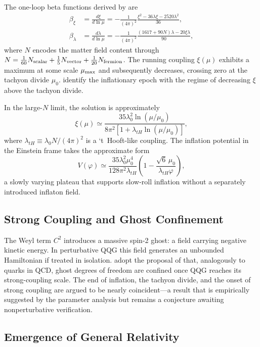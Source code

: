 \documentclass[12pt, a4paper]{article}
\begin{document}
The one-loop beta functions derived by \citet{Buccio2024} are
\begin{align}
\beta_\xi &= \frac{d\xi}{d\ln\mu} = -\frac{1}{(4\pi)^2}\frac{\xi^2 - 36\lambda\xi - 2520\lambda^2}{36}, \\
\beta_\lambda &= \frac{d\lambda}{d\ln\mu} = -\frac{1}{(4\pi)^2}\frac{(1617 + 90N)\lambda - 20\xi\lambda}{90},
\end{align}
where $N$ encodes the matter field content through $N = \frac{1}{60}N_{\rm scalar} +
\frac{1}{5}N_{\rm vector} + \frac{1}{20}N_{\rm fermion}$. The running coupling
$\xi(\mu)$ exhibits a maximum at some scale $\mu_{\rm max}$ and subsequently
decreases, crossing zero at the tachyon divide $\mu_0$. \citet{Liu2026} identify
the inflationary epoch with the regime of decreasing $\xi$ above the tachyon divide.

In the large-$N$ limit, the solution is approximately
\begin{equation}
\xi(\mu) \simeq \frac{35\lambda_0^2\ln(\mu/\mu_0)}{8\pi^2[1 + \lambda_{tH}\ln(\mu/\mu_0)]},
\end{equation}
where $\lambda_{tH} \equiv \lambda_0 N/(4\pi)^2$ is a `t~Hooft-like coupling. The
inflation potential in the Einstein frame takes the approximate form
\begin{equation}
V(\varphi) \simeq \frac{35\lambda_0^2\mu_0^4}{128\pi^2\lambda_{tH}}
\left(1 - \frac{\sqrt{6}\,\mu_0}{\lambda_{tH}\varphi}\right),
\end{equation}
a slowly varying plateau that supports slow-roll inflation without a separately
introduced inflaton field.

\subsection{Strong Coupling and Ghost Confinement}

The Weyl term $C^2$ introduces a massive spin-2 ghost: a field carrying negative
kinetic energy. In perturbative QQG this field generates an unbounded Hamiltonian
if treated in isolation. \citet{Liu2026} adopt the proposal of \citet{Holdom2016}
that, analogously to quarks in QCD, ghost degrees of freedom are confined once QQG
reaches its strong-coupling scale. The end of inflation, the tachyon divide, and
the onset of strong coupling are argued to be nearly coincident---a result that is
empirically suggested by the parameter analysis but remains a conjecture awaiting
nonperturbative verification.

\subsection{Emergence of General Relativity}
\end{document}
